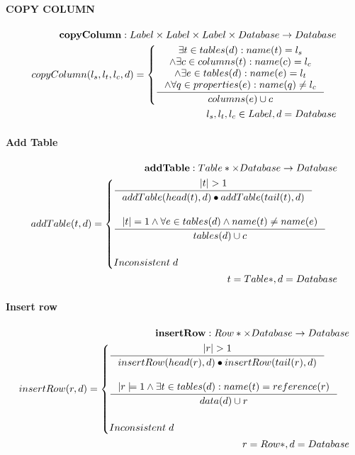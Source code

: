 \documentclass[11pt]{article}
\begin{document}
\paragraph{COPY COLUMN}
\begin{align*}
	\mathbf{copyColumn} : Label \times Label \times Label \times Database \rightarrow Database \\
	copyColumn(l_s, l_t, l_c, d) = \begin{cases}
 		\inference{\exists t \in tables(d) : name(t) = l_s \\ \wedge \exists c \in columns(t) : name(c) = l_c \\ \wedge \exists e \in tables(d) : name(e) = l_t  \\ \wedge \forall q \in properties(e) : name(q) \neq l_c}{columns(e) \cup c }
	\end{cases} \\
	l_s,l_t,l_c \in Label, d = Database
\end{align*}
\paragraph{Add Table}
\begin{align*}
	\mathbf{addTable} : Table* \times Database \rightarrow Database \\ 
	addTable(t, d) = \begin{cases}
		\inference{|t| > 1}{addTable(head(t),d) \bullet addTable(tail(t), d)}
\\ \\	
		\inference{|t| = 1 \wedge \forall e \in tables(d) \wedge name(t) \neq name(e)}{tables(d) \cup c}
\\ \\
		Inconsistent \;d 
	 \end{cases}\\ 
	t = Table*,  d = Database
\end{align*}
\paragraph{Insert row}
\begin{align*}
	\mathbf{insertRow} : Row* \times Database \rightarrow Database \\
	insertRow(r, d) = \begin{cases}
			\inference{|r|>1}{insertRow(head(r), d) \bullet insertRow(tail(r), d)} \\ \\
		 	\inference{|r|=1 \wedge \exists t \in tables(d) : name(t) = reference(r) }{data(d) \cup r} \\ \\
			 Inconsistent \; d
		 \end{cases}	\\
		 r = Row*, d = Database
\end{align*}
\end{document}
